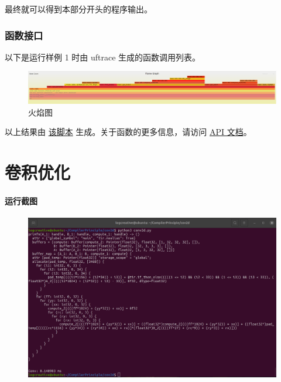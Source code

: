\documentclass[UTF8]{ctexart}
\begin{document}
最终就可以得到本部分开头的程序输出。

\section{函数接口}

以下是运行样例 1 时由 uftrace\cite{uft} 生成的函数调用列表。


\begin{figure}[H]
    \centering
        \includegraphics[width=\textwidth]{img/flame.png}
    \caption{火焰图\cite{flame}}
    \label{fig:flame}
\end{figure}

以上结果由 \href{run:../opg/uftrace.sh}{该脚本} 生成。关于函数的更多信息，请访问 \href{run:../opg/target/doc/opg/index.html}{API 文档}。%

\part{卷积优化}
\subsection*{运行截图}
\begin{figure}[H]
	\centering
    \includegraphics[width=\textwidth]{img/raw1.png}
\end{figure}
\end{document}
